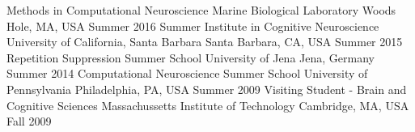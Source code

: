 \begin{cventries}
  \cventry
    {Methods in Computational Neuroscience}
    {Marine Biological Laboratory}
    {Woods Hole, MA, USA}
    {Summer 2016}
    {}
  \cventry
    {Summer Institute in Cognitive Neuroscience}
    {University of California, Santa Barbara}
    {Santa Barbara, CA, USA}
    {Summer 2015}
    {}
  \cventry
    {Repetition Suppression Summer School}
    {University of Jena}
    {Jena, Germany}
    {Summer 2014}
    {}
  \cventry
    {Computational Neuroscience Summer School}
    {University of Pennsylvania}
    {Philadelphia, PA, USA}
    {Summer 2009}
    {}
  \cventry
    {Visiting Student - Brain and Cognitive Sciences}
    {Massachussetts Institute of Technology}
    {Cambridge, MA, USA}
    {Fall 2009}
    {}
\end{cventries}
